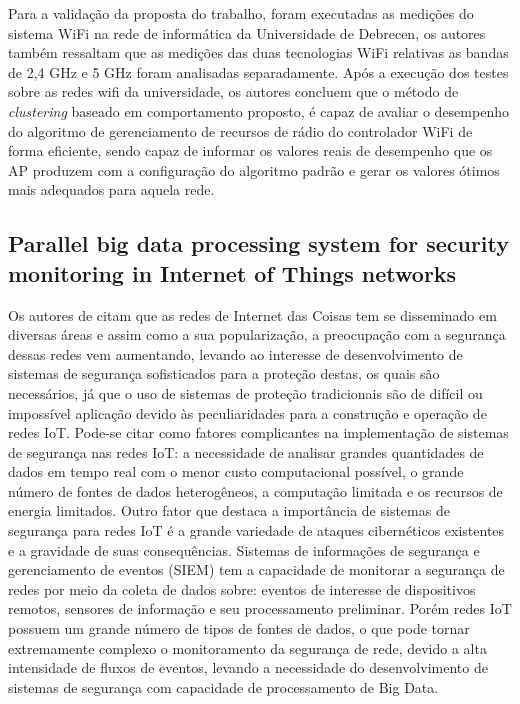 \documentclass[ti,table]{texufpel} %
\begin{document}
     

     Para a validação da proposta do trabalho, foram executadas as medições do sistema WiFi na rede de informática da Universidade de Debrecen, os autores também ressaltam que as medições das duas tecnologias WiFi relativas as bandas de 2,4 GHz e 5 GHz foram analisadas separadamente. Após a execução dos testes sobre as redes wifi da universidade, os autores concluem que o método de \textit{clustering} baseado em comportamento proposto, é capaz de avaliar o desempenho do algoritmo de gerenciamento de recursos de rádio do controlador WiFi de forma eficiente, sendo capaz de informar os valores reais de desempenho que os AP produzem com a configuração do algoritmo padrão e gerar os valores ótimos mais adequados para aquela rede. 

  

  

  

\subsection{Parallel big data processing system for security monitoring in Internet of Things networks} 

  

  

    Os autores de \cite{art8kotenko2017parallel} citam que as redes de Internet das Coisas tem se disseminado em diversas áreas e assim como a sua popularização, a preocupação com a segurança dessas redes vem aumentando, levando ao interesse de desenvolvimento de sistemas de segurança sofisticados para a proteção destas, os quais são necessários, já que o uso de sistemas de proteção tradicionais são de difícil ou impossível aplicação devido às peculiaridades para a construção e operação de redes IoT. Pode-se citar como fatores complicantes na implementação de sistemas de segurança nas redes IoT: a necessidade de analisar grandes quantidades de dados em tempo real com o menor custo computacional possível, o grande número de fontes de dados heterogêneos, a computação limitada e os recursos de energia limitados. Outro fator que destaca a importância de sistemas de segurança para redes IoT é a grande variedade de ataques cibernéticos existentes e a gravidade de suas consequências. Sistemas de informações de segurança e gerenciamento de eventos (SIEM) tem a capacidade de monitorar a segurança de redes por meio da coleta de dados sobre: eventos de interesse de dispositivos remotos, sensores de informação e seu processamento preliminar. Porém redes IoT possuem um grande número de tipos de fontes de dados, o que pode tornar extremamente complexo o monitoramento da segurança de rede, devido a alta intensidade de fluxos de eventos, levando a necessidade do desenvolvimento de sistemas de segurança com capacidade de processamento de Big Data. 
\end{document}
